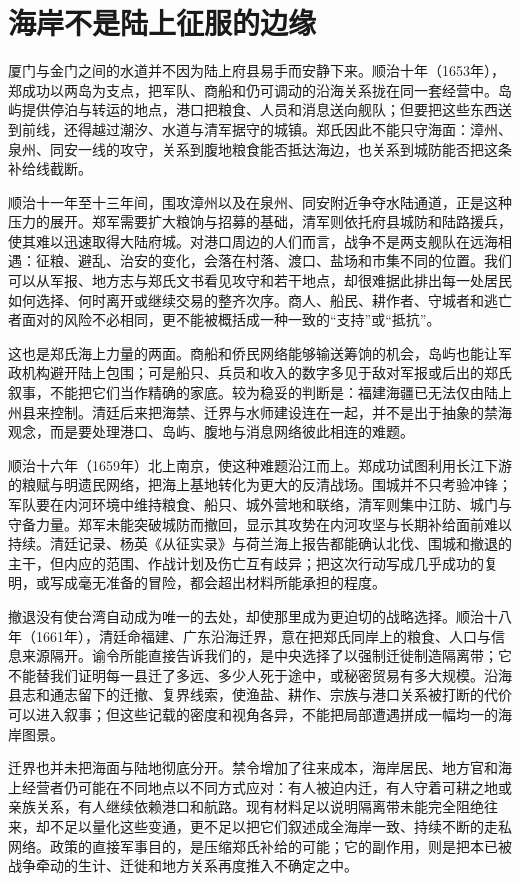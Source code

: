 \section{海岸不是陆上征服的边缘}

厦门与金门之间的水道并不因为陆上府县易手而安静下来。顺治十年（1653年），郑成功以两岛为支点，把军队、商船和仍可调动的沿海关系拢在同一套经营中。岛屿提供停泊与转运的地点，港口把粮食、人员和消息送向舰队；但要把这些东西送到前线，还得越过潮汐、水道与清军据守的城镇。郑氏因此不能只守海面：漳州、泉州、同安一线的攻守，关系到腹地粮食能否抵达海边，也关系到城防能否把这条补给线截断。

顺治十一年至十三年间，围攻漳州以及在泉州、同安附近争夺水陆通道，正是这种压力的展开。郑军需要扩大粮饷与招募的基础，清军则依托府县城防和陆路援兵，使其难以迅速取得大陆府城。对港口周边的人们而言，战争不是两支舰队在远海相遇：征粮、避乱、治安的变化，会落在村落、渡口、盐场和市集不同的位置。我们可以从军报、地方志与郑氏文书看见攻守和若干地点，却很难据此排出每一处居民如何选择、何时离开或继续交易的整齐次序。商人、船民、耕作者、守城者和逃亡者面对的风险不必相同，更不能被概括成一种一致的“支持”或“抵抗”。

这也是郑氏海上力量的两面。商船和侨民网络能够输送筹饷的机会，岛屿也能让军政机构避开陆上包围；可是船只、兵员和收入的数字多见于敌对军报或后出的郑氏叙事，不能把它们当作精确的家底。较为稳妥的判断是：福建海疆已无法仅由陆上州县来控制。清廷后来把海禁、迁界与水师建设连在一起，并不是出于抽象的禁海观念，而是要处理港口、岛屿、腹地与消息网络彼此相连的难题。

顺治十六年（1659年）北上南京，使这种难题沿江而上。郑成功试图利用长江下游的粮赋与明遗民网络，把海上基地转化为更大的反清战场。围城并不只考验冲锋；军队要在内河环境中维持粮食、船只、城外营地和联络，清军则集中江防、城门与守备力量。郑军未能突破城防而撤回，显示其攻势在内河攻坚与长期补给面前难以持续。清廷记录、杨英《从征实录》与荷兰海上报告都能确认北伐、围城和撤退的主干，但内应的范围、作战计划及伤亡互有歧异；把这次行动写成几乎成功的复明，或写成毫无准备的冒险，都会超出材料所能承担的程度。

撤退没有使台湾自动成为唯一的去处，却使那里成为更迫切的战略选择。顺治十八年（1661年），清廷命福建、广东沿海迁界，意在把郑氏同岸上的粮食、人口与信息来源隔开。谕令所能直接告诉我们的，是中央选择了以强制迁徙制造隔离带；它不能替我们证明每一县迁了多远、多少人死于途中，或秘密贸易有多大规模。沿海县志和通志留下的迁撤、复界线索，使渔盐、耕作、宗族与港口关系被打断的代价可以进入叙事；但这些记载的密度和视角各异，不能把局部遭遇拼成一幅均一的海岸图景。

迁界也并未把海面与陆地彻底分开。禁令增加了往来成本，海岸居民、地方官和海上经营者仍可能在不同地点以不同方式应对：有人被迫内迁，有人守着可耕之地或亲族关系，有人继续依赖港口和航路。现有材料足以说明隔离带未能完全阻绝往来，却不足以量化这些变通，更不足以把它们叙述成全海岸一致、持续不断的走私网络。政策的直接军事目的，是压缩郑氏补给的可能；它的副作用，则是把本已被战争牵动的生计、迁徙和地方关系再度推入不确定之中。

